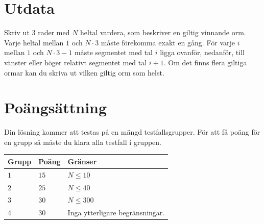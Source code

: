 \section*{Utdata}
Skriv ut $3$ rader med $N$ heltal vardera, som beskriver en giltig vinnande orm. Varje heltal mellan $1$ och $N \cdot 3$
måste förekomma exakt en gång. För varje $i$ mellan $1$ och $N \cdot 3 - 1$ måste segmentet med tal $i$ ligga ovanför, nedanför,
till vänster eller höger relativt segmentet med tal $i+1$. Om det finns flera giltiga ormar kan du skriva ut
vilken giltig orm som helst.

\section*{Poängsättning}
Din lösning kommer att testas på en mängd testfallsgrupper.
För att få poäng för en grupp så måste du klara alla testfall i gruppen.

\noindent
\begin{tabular}{| l | l | p{12cm} |}
  \hline
  \textbf{Grupp} & \textbf{Poäng} & \textbf{Gränser} \\ \hline
  $1$    & $15$         & $N \leq 10$  \\ \hline
  $2$    & $25$         & $N \leq 40$ \\ \hline
  $3$    & $30$         & $N \leq 300$ \\ \hline
  $4$    & $30$         & Inga ytterligare begränsningar. \\ \hline
\end{tabular}

